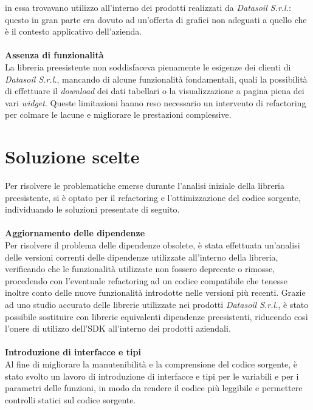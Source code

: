 in essa trovavano utilizzo all'interno dei prodotti realizzati da \textit{Datasoil S.r.l.}: questo in gran parte era dovuto ad un'offerta di grafici non adeguati
a quello che è il contesto applicativo dell'azienda.\\
\\
\textbf{Assenza di funzionalità}\\
La libreria preesistente non soddisfaceva pienamente le esigenze dei clienti di \textit{Datasoil S.r.l.}, mancando di alcune funzionalità fondamentali,
quali la possibilità di effettuare il \textit{download} dei dati tabellari o la visualizzazione a pagina piena dei vari \textit{widget}.
Queste limitazioni hanno reso necessario un intervento di refactoring per colmare le lacune e migliorare le prestazioni complessive.

\section{Soluzione scelte}
Per risolvere le problematiche emerse durante l'analisi iniziale della libreria preesistente, si è optato per il refactoring e l'ottimizzazione
del codice sorgente, individuando le soluzioni presentate di seguito.\\
\\
\textbf{Aggiornamento delle dipendenze}\\
Per risolvere il problema delle dipendenze obsolete, è stata effettuata un'analisi delle versioni correnti delle dipendenze utilizzate all'interno della libreria,
verificando che le funzionalità utilizzate non fossero deprecate o rimosse, procedendo con l'eventuale refactoring ad un codice compatibile che tenesse inoltre conto
delle nuove funzionalità introdotte nelle versioni più recenti. \newline
Grazie ad uno studio accurato delle librerie utilizzate nei prodotti \textit{Datasoil S.r.l.}, è stato possibile sostituire con librerie equivalenti dipendenze preesistenti,
riducendo così l'onere di utilizzo dell'SDK all'interno dei prodotti aziendali. \\
\\
\textbf{Introduzione di interfacce e tipi}\\
Al fine di migliorare la manutenibilità e la comprensione del codice sorgente, è stato svolto un lavoro di introduzione di interfacce e tipi per le variabili e per i parametri
delle funzioni, in modo da rendere il codice più leggibile e permettere controlli statici sul codice sorgente. \newline
